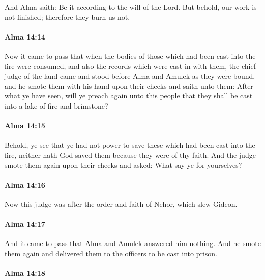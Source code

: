 			And Alma saith:
			Be it according to the will of the Lord.
			But behold, our work is not finished;
			therefore they burn us not.

		\paragraph{Alma 14:14} %
			\label{ALMA-14-14}

			Now it came to pass that when the bodies of those
			which had been cast into the fire were consumed,
			and also the records which were cast in with them,
			the chief judge of the land came
			and stood before Alma and Amulek as they were bound,
			and he smote them with his hand upon their cheeks
			and saith unto them:
			After what ye have seen, will ye preach again unto this people
			that they shall be cast into a lake of fire and brimstone?

		\paragraph{Alma 14:15} %
			\label{ALMA-14-15}

			Behold, ye see that ye had not power to save these
			which had been cast into the fire,
			neither hath God saved them because they were of thy faith.
			And the judge smote them again upon their cheeks and asked:
			What say ye for yourselves?

		\paragraph{Alma 14:16} %
			\label{ALMA-14-16}

			Now this judge was after the order and faith of Nehor, which slew Gideon.

		\paragraph{Alma 14:17} %
			\label{ALMA-14-17}

			And it came to pass that Alma and Amulek answered him nothing.
			And he smote them again
			and delivered them to the officers to be cast into prison.

		\paragraph{Alma 14:18} %
			\label{ALMA-14-18}

